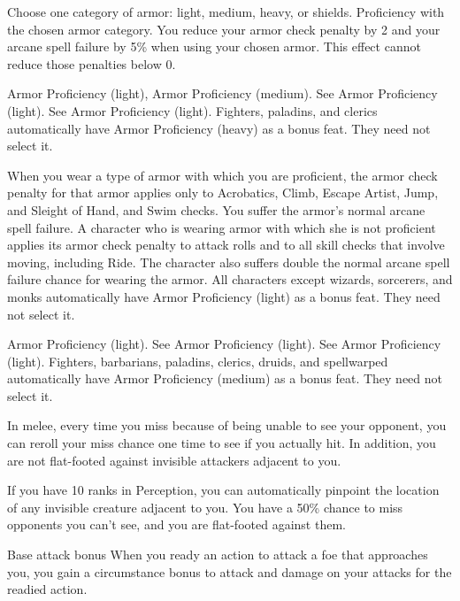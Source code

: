Choose one category of armor: light, medium, heavy, or shields.
 Proficiency with the chosen armor category.
 You reduce your armor check penalty by 2 and your arcane spell failure by 5\% when using your chosen armor. This effect cannot reduce those penalties below 0.

 Armor Proficiency (light), Armor Proficiency (medium).
 See Armor Proficiency (light).
 See Armor Proficiency (light).
 Fighters, paladins, and clerics automatically have Armor Proficiency (heavy) as a bonus feat. They need not select it.

 When you wear a type of armor with which you are proficient, the armor check penalty for that armor applies only to Acrobatics, Climb, Escape Artist, Jump, and Sleight of Hand, and Swim checks. You suffer the armor's normal arcane spell failure.
 A character who is wearing armor with which she is not proficient applies its armor check penalty to attack rolls and to all skill checks that involve moving, including Ride. The character also suffers double the normal arcane spell failure chance for wearing the armor.
 All characters except wizards, sorcerers, and monks automatically have Armor Proficiency (light) as a bonus feat. They need not select it.

 Armor Proficiency (light).
 See Armor Proficiency (light).
 See Armor Proficiency (light).
 Fighters, barbarians, paladins, clerics, druids, and spellwarped automatically have Armor Proficiency (medium) as a bonus feat. They need not select it.

 In melee, every time you miss because of being unable to see your opponent, you can reroll your miss chance one time to see if you actually hit. In addition, you are not flat-footed against invisible attackers adjacent to you.
\par If you have 10 ranks in Perception, you can automatically pinpoint the location of any invisible creature adjacent to you. 
 You have a 50\% chance to miss opponents you can't see, and you are flat-footed against them.

 Base attack bonus 
 When you ready an action to attack a foe that approaches you, you gain a  circumstance bonus to attack and damage on your attacks for the readied action.

